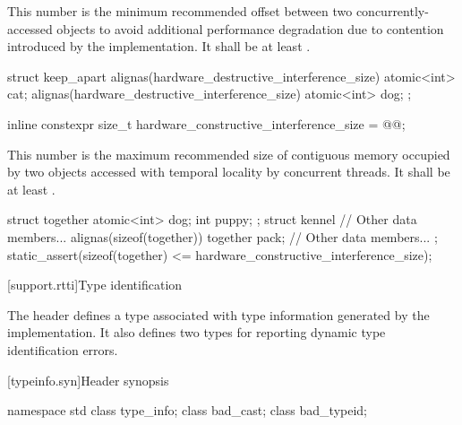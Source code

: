 \pnum
This number is the minimum recommended offset
between two concurrently-accessed objects
to avoid additional performance degradation due to contention
introduced by the implementation.
It shall be at least .

%
\begin{example}
\begin{codeblock}
struct keep_apart {
  alignas(hardware_destructive_interference_size) atomic<int> cat;
  alignas(hardware_destructive_interference_size) atomic<int> dog;
};
\end{codeblock}
\end{example}

%
\begin{itemdecl}
inline constexpr size_t hardware_constructive_interference_size = @\impdef{}@;
\end{itemdecl}

\pnum
This number is the maximum recommended size of contiguous memory
occupied by two objects accessed with temporal locality by concurrent threads.
It shall be at least .

%
\begin{example}
\begin{codeblock}
struct together {
  atomic<int> dog;
  int puppy;
};
struct kennel {
  // Other data members...
  alignas(sizeof(together)) together pack;
  // Other data members...
};
static_assert(sizeof(together) <= hardware_constructive_interference_size);
\end{codeblock}
\end{example}

[support.rtti]{Type identification}

\pnum
The header
defines a
type associated with type information generated by the implementation.
It also defines two types for reporting dynamic type identification errors.

[typeinfo.syn]{Header  synopsis}
%
%
%
%

\begin{codeblock}
namespace std {
  class type_info;
  class bad_cast;
  class bad_typeid;
}
\end{codeblock}

